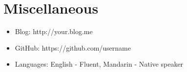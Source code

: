 \documentclass{resume}
\begin{document}

\section{Miscellaneous}
\begin{itemize}[parsep=0.5ex]
  \item Blog: http://your.blog.me
  \item GitHub: https://github.com/username
  \item Languages: English - Fluent, Mandarin - Native speaker
\end{itemize}

%
%
\end{document}
